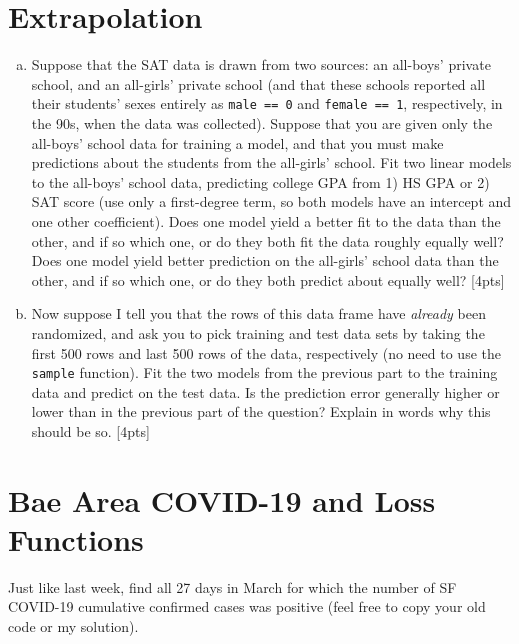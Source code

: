 \documentclass[12pt]{article}
\begin{document}
\section{Extrapolation}

\begin{enumerate}[(a)]
	\item Suppose that the SAT data is drawn from two sources: an all-boys' private school, and an all-girls' private school (and that these schools reported all their students' sexes entirely as \verb|male == 0| and \verb|female == 1|, respectively, in the 90s, when the data was collected). Suppose that you are given only the all-boys' school data for training a model, and that you must make predictions about the students from the all-girls' school. Fit two linear models to the all-boys' school data, predicting college GPA from 1) HS GPA or 2) SAT score (use only a first-degree term, so both models have an intercept and one other coefficient). Does one model yield a better fit to the data than the other, and if so which one, or do they both fit the data roughly equally well? Does one model yield better prediction on the all-girls' school data than the other, and if so which one, or do they both predict about equally well? [4pts]
	\item Now suppose I tell you that the rows of this data frame have \textit{already} been randomized, and ask you to pick training and test data sets by taking the first 500 rows and last 500 rows of the data, respectively (no need to use the \verb|sample| function). Fit the two models from the previous part to the training data and predict on the test data. Is the prediction error generally higher or lower than in the previous part of the question? Explain in words why this should be so. [4pts]
\end{enumerate}

\section{Bae Area COVID-19 and Loss Functions}

Just like last week, find all 27 days in March for which the number of SF COVID-19 cumulative confirmed cases was positive (feel free to copy your old code or my solution).
\end{document}

